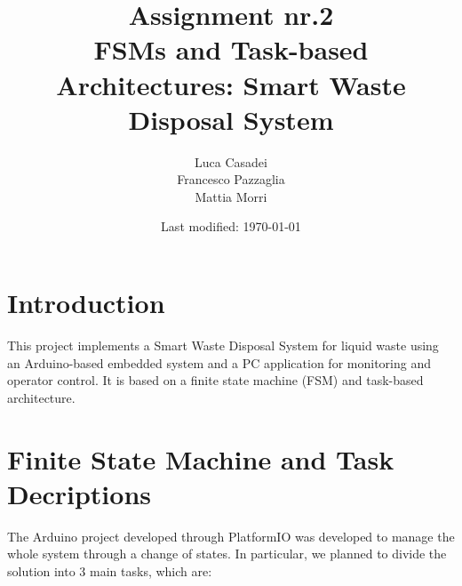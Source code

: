 \documentclass[a4paper]{article}
\author{Luca Casadei\\Francesco Pazzaglia\\Mattia Morri}
\date{Last modified: \today}
\title{\textbf{Assignment nr.2\\FSMs and Task-based Architectures: Smart Waste Disposal System}}
\begin{document}
	\maketitle
	\tableofcontents
	\section{Introduction}
	This project implements a Smart Waste Disposal System for liquid waste using an Arduino-based embedded system and a PC application for monitoring and operator control. It is based on a finite state machine (FSM) and task-based architecture.
	
	\section{Finite State Machine and Task Decriptions}
	The Arduino project developed through PlatformIO was developed to manage the whole system through a change of states. In particular, we planned to divide the solution into 3 main tasks, which are:
\end{document}

